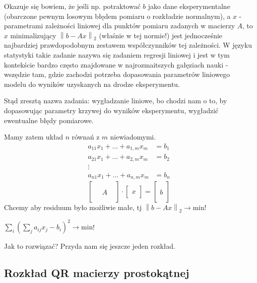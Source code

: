 \documentclass[hidelinks,a4paper,fleqn,oneside]{book}
\newcommand{\ra}{\rightarrow}
\newcommand{\norm}[1]{\left\lVert#1\right\rVert}
\begin{document}
Okazuje się bowiem, że jeśli np. potraktować $b$ jako dane eksperymentalne (obarczone pewnym losowym błędem pomiaru o rozkładzie normalnym), a $x$ - parametrami zależności liniowej dla punktów pomiaru zadanych w macierzy $A$, to $x$ minimalizujący $\norm{b-Ax}_2$ (właśnie w tej normie!) jest jednocześnie najbardziej prawdopodobnym zestawem współczynników tej zależności. W języku statystyki takie zadanie nazywa się zadaniem regresji liniowej i jest w tym kontekście bardzo często znajdowane w najrozmaitszych gałęziach nauki - wszędzie tam, gdzie zachodzi potrzeba dopasowania parametrów liniowego modelu do wyników uzyskanych na drodze eksperymentu.

Stąd zresztą nazwa zadania: wygładzanie liniowe, bo chodzi nam o to, by dopasowując parametry krzywej do wyników eksperymentu, wygładzić ewentualne błędy pomiarowe.

Mamy zatem układ $n$ równań z $m$ niewiadomymi.
\begin{align*}
	a_{11}x_{1} + ... + a_{1, m}x_m & = b_1 \\
	a_{21}x_{1} + ... + a_{2, m}x_m & = b_2 \\
	\vdots & \\
	a_{n1}x_{1} + ... + a_{n, m}x_m & = b_n
\end{align*}
\[
\left[
	\begin{array}{cc}
	 \\
	 \\
	 \quad A 
	 \\
	 \\ &
	\end{array}
\right]
	\cdot
\left[
	\begin{array}{c}
	 \\
	 x
	 \\ \ 
	\end{array}
\right]
=
\left[
	\begin{array}{c}
	 \\
	 \\
	 b
	 \\
	 \\ \ 
	\end{array}
\right]
\]
Chcemy aby residuum było możliwie małe, tj $\norm{b - Ax}_2 \ra \textrm{min}$!

$\sum_{i}(\sum_{j} a_{ij} x_{j} - b_{i})^2 \ra \textrm{min}$!

Jak to rozwiązać? Przyda nam się jeszcze jeden rozkład.

\subsection{Rozkład QR macierzy prostokątnej} 
\end{document}
